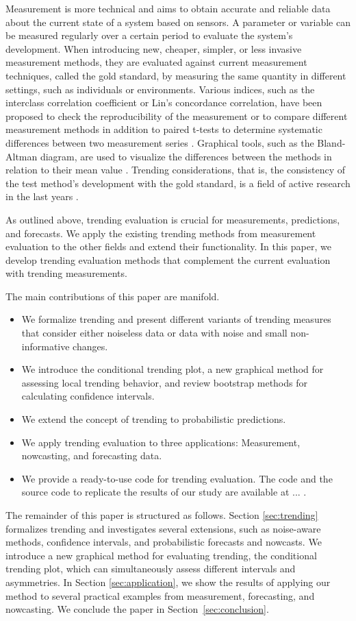 Measurement is more technical and aims to obtain accurate and reliable data about the current state of a system based on sensors. 
A parameter or variable can be measured regularly over a certain period to evaluate the system's development.
When introducing new, cheaper, simpler, or less invasive measurement methods, they are evaluated against current measurement techniques, called the gold standard, by measuring the same quantity in different settings, such as individuals or environments.
Various indices, such as the interclass correlation coefficient or Lin's concordance correlation, have been proposed to check the reproducibility of the measurement or to compare different measurement methods \parencite{lawrence1989concordance,koo2016guideline} in addition to paired t-tests to determine systematic differences between two measurement series \parencite{watson2010method}. 
Graphical tools, such as the Bland-Altman diagram, are used to visualize the differences between the methods in relation to their mean value \parencite{bland1986statistical}. 
Trending considerations, that is, the consistency of the test method's development with the gold standard, is a field of active research in the last years \parencite{Saugel2015,saugel2018error,hiraishi2021concordance}. 

As outlined above, trending evaluation is crucial for measurements, predictions, and forecasts. 
We apply the existing trending methods from measurement evaluation to the other fields and extend their functionality.
In this paper, we develop trending evaluation methods that complement the current evaluation with trending measurements.

The main contributions of this paper are manifold.
\begin{itemize}
\item We formalize trending and present different variants of trending measures that consider either noiseless data or data with noise and small non-informative changes.
\item We introduce the conditional trending plot, a new graphical method for assessing local trending behavior, and review bootstrap methods for calculating confidence intervals.
\item We extend the concept of trending to probabilistic predictions.
\item We apply trending evaluation to three applications: Measurement, nowcasting, and forecasting data. 
\item We provide a ready-to-use code for trending evaluation. The code and the source code to replicate the results of our study are available at ... .
\end{itemize}

The remainder of this paper is structured as follows. 
Section \ref{sec:trending} formalizes trending and investigates several extensions, such as noise-aware methods, confidence intervals, and probabilistic forecasts and nowcasts. 
We introduce a new graphical method for evaluating trending, the conditional trending plot, which can simultaneously assess different intervals and asymmetries. 
In Section \ref{sec:application}, we show the results of applying our method to several practical examples from measurement, forecasting, and nowcasting. 
We conclude the paper in Section~\ref{sec:conclusion}.
